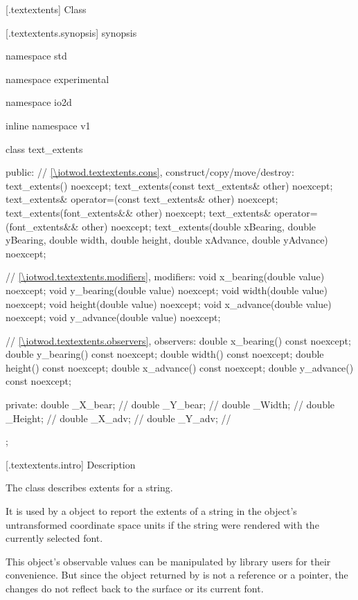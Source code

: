  [\iotwod.textextents] {Class }

 [\iotwod.textextents.synopsis] { synopsis}

\begin{codeblock}
namespace std { namespace experimental { namespace io2d { inline namespace v1 {
  class text_extents {
  public:
    // \ref{\iotwod.textextents.cons}, construct/copy/move/destroy:
    text_extents() noexcept;
    text_extents(const text_extents& other) noexcept;
    text_extents& operator=(const text_extents& other) noexcept;
    text_extents(font_extents&& other) noexcept;
    text_extents& operator=(font_extents&& other) noexcept;
    text_extents(double xBearing, double yBearing, double width,
      double height, double xAdvance, double yAdvance) noexcept;

    // \ref{\iotwod.textextents.modifiers}, modifiers:
    void x_bearing(double value) noexcept;
    void y_bearing(double value) noexcept;
    void width(double value) noexcept;
    void height(double value) noexcept;
    void x_advance(double value) noexcept;
    void y_advance(double value) noexcept;

    // \ref{\iotwod.textextents.observers}, observers:
    double x_bearing() const noexcept;
    double y_bearing() const noexcept;
    double width() const noexcept;
    double height() const noexcept;
    double x_advance() const noexcept;
    double y_advance() const noexcept;

  private:
    double _X_bear; // \expos
    double _Y_bear; // \expos
    double _Width;  // \expos
    double _Height; // \expos
    double _X_adv;  // \expos
    double _Y_adv;  // \expos
  };
} } } }
\end{codeblock}

 [\iotwod.textextents.intro] { Description}

\pnum
{}
The class  describes extents for a string.

\pnum
It is used by a  object to report the extents of a string in the  object's untransformed coordinate space units if the string were rendered with the currently selected font.

\pnum
\enternote
This object's observable values can be manipulated by library users for their convenience. But since the  object returned by  is not a reference or a pointer, the changes do not reflect back to the surface or its current font.
\exitnote


